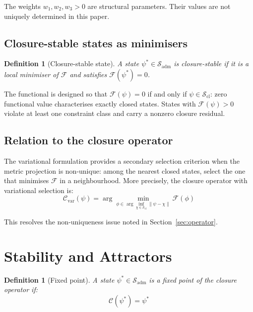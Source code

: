 \documentclass[12pt]{article}
\newtheorem{definition}[theorem]{Definition}
\newcommand{\Ccal}{\mathcal{C}}
\newcommand{\Fcal}{\mathcal{F}}
\newcommand{\Sadm}{\mathcal{S}_{\mathrm{adm}}}
\newcommand{\Scl}{\mathcal{S}_{\mathrm{cl}}}
\begin{document}
The weights $w_1, w_2, w_3 > 0$ are structural parameters. Their values are not uniquely determined in this paper.

\subsection{Closure-stable states as minimisers}

\begin{definition}[Closure-stable state]\label{def:stable}
A state $\psi^* \in \Sadm$ is closure-stable if it is a local minimiser of $\Fcal$ and satisfies $\Fcal(\psi^*) = 0$.
\end{definition}

The functional is designed so that $\Fcal(\psi) = 0$ if and only if $\psi \in \Scl$: zero functional value characterises exactly closed states. States with $\Fcal(\psi) > 0$ violate at least one constraint class and carry a nonzero closure residual.

\subsection{Relation to the closure operator}

The variational formulation provides a secondary selection criterion when the metric projection is non-unique: among the nearest closed states, select the one that minimises $\Fcal$ in a neighbourhood. More precisely, the closure operator with variational selection is:
\begin{equation}
    \Ccal_{\mathrm{var}}(\psi) = \arg\min_{\phi \in \arg\inf_{\chi \in \Scl} \|\psi - \chi\|} \Fcal(\phi)
\end{equation}

This resolves the non-uniqueness issue noted in Section~\ref{sec:operator}.

\section{Stability and Attractors}\label{sec:attractors}

\begin{definition}[Fixed point]\label{def:fixedpoint}
A state $\psi^* \in \Sadm$ is a fixed point of the closure operator if:
\begin{equation}
    \Ccal(\psi^*) = \psi^*
\end{equation}
\end{definition}
\end{document}

